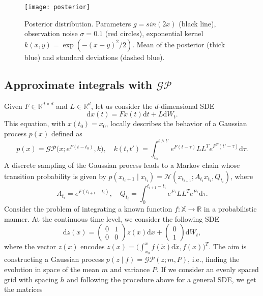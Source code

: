 \documentclass{scrartcl}
\theoremstyle{definition}
\theoremstyle{remark}
\numberwithin{definition}{section}
\numberwithin{remark}{section}
\newcommand{\R}{\mathbb{R}}
\newcommand{\dd}{\mathrm{d}}
\newcommand{\gauss}{\mathcal{N}}
\newcommand{\GP}{\mathcal{GP}}
\begin{document}
\begin{figure}[t]
	\centering
	\texttt{[image: posterior]}
	\caption{Posterior distribution. Parameters $g = sin(2x)$ (black line), observation noise $\sigma = 0.1$ (red circles), exponential kernel $k(x, y) = \exp(-(x - y)^2/2)$. Mean of the posterior (thick blue) and standard deviations (dashed blue).} 
\end{figure}

\subsection{Approximate integrals with $\GP$}
Given $F \in \R^{d\times d}$ and $L \in \R^d$, let us consider the $d$-dimensional SDE 
\begin{equation}
	\dd x(t) = F x(t) \dd t + L \dd W_t.
\end{equation}
This equation, with $x(t_0) = x_0$, locally describes the behavior of a Gaussian process $p(x)$ defined as
\begin{equation}
	p(x) = \GP\big(x; e^{F(t-t_0)}, k\big), \quad k(t, t') = \int_{t_0}^{t\land t'} e^{F(t-\tau)}LL^Te^{F^T(t'-\tau)} \dd\tau.
\end{equation}
A discrete sampling of the Gaussian process leads to a Markov chain whose transition probability is given by $p(x_{t_i+1}\mid x_{t_i}) = \gauss(x_{t_{i+1}}; A_{t_i}x_{t_i}, Q_{t_i})$, where
\begin{equation}\label{eq:MatrixMarkov}
	A_{t_i} = e^{F(t_{i+1} - t_i)}, \quad Q_{t_i} = \int_{0}^{t_{i+1}-t_i} e^{F\tau}LL^T e^{F\tau}\dd \tau.
\end{equation}
Consider the problem of integrating a known function $f\colon \mathbb{X} \to \R$ in a probabilistic manner. At the continuous time level, we consider the following SDE
\begin{equation}\label{eq:SDEInt}
	\dd z(x) = \begin{pmatrix} 0 & 1 \\ 0 & 0\end{pmatrix} z(x) \dd x + \begin{pmatrix} 0 \\ 1 \end{pmatrix} \dd W_t,
\end{equation}
where the vector $z(x)$ encodes $z(x) = \big(\int_{x_0}^x f(\tilde x) \dd \tilde x, f(x)\big)^T$. The aim is constructing a Gaussian process $p(z \mid f) = \GP(z; m, P)$, i.e., finding the evolution in space of the mean $m$ and variance $P$. If we consider an evenly spaced grid with spacing $h$ and following the procedure above for a general SDE, we get the matrices
\end{document}

